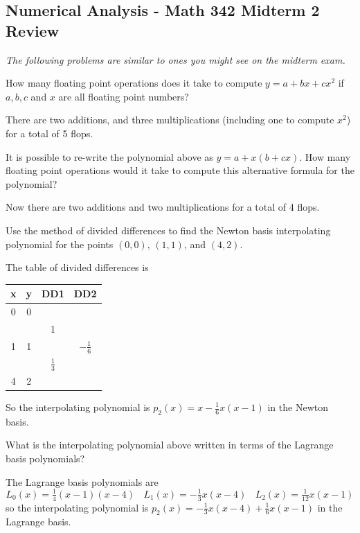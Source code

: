 \documentclass[11pt]{exam}
\begin{document}
\graphicspath{{/home/brian/Dropbox/HSC/Spring16/Math111/}}

\subsection*{Numerical Analysis - Math 342 \hfill Midterm 2 Review}

\textit{The following problems are similar to ones you might see on the midterm exam.}

\begin{questions}

\question How many floating point operations does it take to compute $y = a + bx + cx^2$ if $a, b, c$ and $x$ are all floating point numbers? 
\begin{solution}
There are two additions, and three multiplications (including one to compute $x^2$) for a total of 5 flops. 
\end{solution}
\vfill

\question It is possible to re-write the polynomial above as $y = a + x(b + cx)$.  How many floating point operations would it take to compute this alternative formula for the polynomial? 
\begin{solution}
Now there are two additions and two multiplications for a total of 4 flops. 
\end{solution}
\vfill



\question Use the method of divided differences to find the Newton basis interpolating polynomial for the points $(0,0)$, $(1,1)$, and $(4,2)$.   

\begin{solution}
The table of divided differences is 

\begin{tabular}{c|ccc}
x & y & DD1 & DD2 \\ \hline
0 & 0 & ~  & ~ \\
~ & ~ & 1  & ~ \\
1 & 1 & ~  & $-\tfrac{1}{6}$ \\
~ & ~ & $\tfrac{1}{3}$  & ~ \\
4 & 2 & ~  & ~ \\
\end{tabular}

\noindent
So the interpolating polynomial is $p_2(x) = x - \tfrac{1}{6}x(x-1)$ in the Newton basis.
\end{solution}
\vfill

\question What is the interpolating polynomial above written in terms of the Lagrange basis polynomials? 
\begin{solution}
The Lagrange basis polynomials are
$$L_0(x) = \tfrac{1}{4}(x-1)(x-4) ~~~~ L_1(x) = -\tfrac{1}{3} x(x-4) ~~~~ L_2(x) = \tfrac{1}{12} x(x-1)$$
so the interpolating polynomial is $p_2(x) = -\tfrac{1}{3} x(x-4) + \tfrac{1}{6}x(x-1)$ in the Lagrange basis.
\end{solution}
\vfill


\end{questions}
\end{document}
